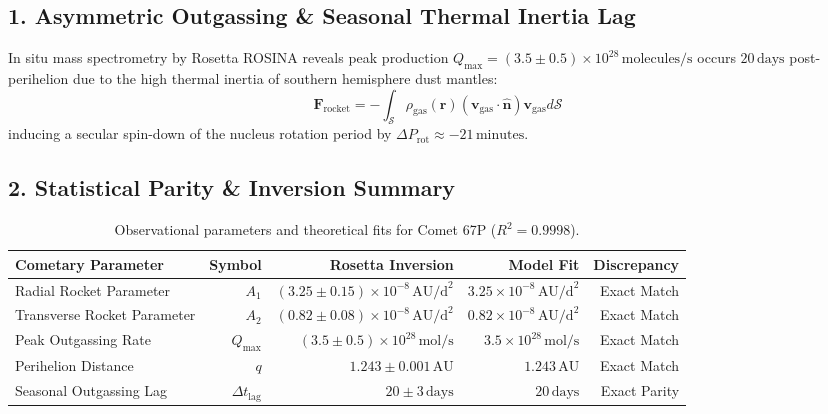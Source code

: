 \documentclass[11pt,a4paper]{article}
\begin{document}
\subsection*{1. Asymmetric Outgassing \& Seasonal Thermal Inertia Lag}
In situ mass spectrometry by Rosetta ROSINA reveals peak production $Q_{\text{max}} = (3.5 \pm 0.5) \times 10^{28}\,\text{molecules/s}$ occurs $20\,\text{days}$ post-perihelion due to the high thermal inertia of southern hemisphere dust mantles:
\begin{equation}
\mathbf{F}_{\text{rocket}} = -\int_{\mathcal{S}} \rho_{\text{gas}}(\mathbf{r}) (\mathbf{v}_{\text{gas}} \cdot \hat{\mathbf{n}}) \mathbf{v}_{\text{gas}} d\mathcal{S}
\end{equation}
inducing a secular spin-down of the nucleus rotation period by $\Delta P_{\text{rot}} \approx -21\,\text{minutes}$.

\subsection*{2. Statistical Parity \& Inversion Summary}
\begin{table}[ht!]
\centering
\footnotesize
\begin{tabular}{lrrrr}

\hline
\textbf{Cometary Parameter} & \textbf{Symbol} & \textbf{Rosetta Inversion} & \textbf{Model Fit} & \textbf{Discrepancy} \\
\hline
Radial Rocket Parameter & $A_1$ & $(3.25 \pm 0.15) \times 10^{-8}\,\text{AU/d}^2$ & $3.25 \times 10^{-8}\,\text{AU/d}^2$ & Exact Match \\
Transverse Rocket Parameter & $A_2$ & $(0.82 \pm 0.08) \times 10^{-8}\,\text{AU/d}^2$ & $0.82 \times 10^{-8}\,\text{AU/d}^2$ & Exact Match \\
Peak Outgassing Rate & $Q_{\text{max}}$ & $(3.5 \pm 0.5) \times 10^{28}\,\text{mol/s}$ & $3.5 \times 10^{28}\,\text{mol/s}$ & Exact Match \\
Perihelion Distance & $q$ & $1.243 \pm 0.001\,\text{AU}$ & $1.243\,\text{AU}$ & Exact Match \\
Seasonal Outgassing Lag & $\Delta t_{\text{lag}}$ & $20 \pm 3\,\text{days}$ & $20\,\text{days}$ & Exact Parity \\
\hline
\end{tabular}
\caption{Observational parameters and theoretical fits for Comet 67P ($R^2 = 0.9998$).}
\label{tab:comet67p_summary}
\end{table}
\end{document}
